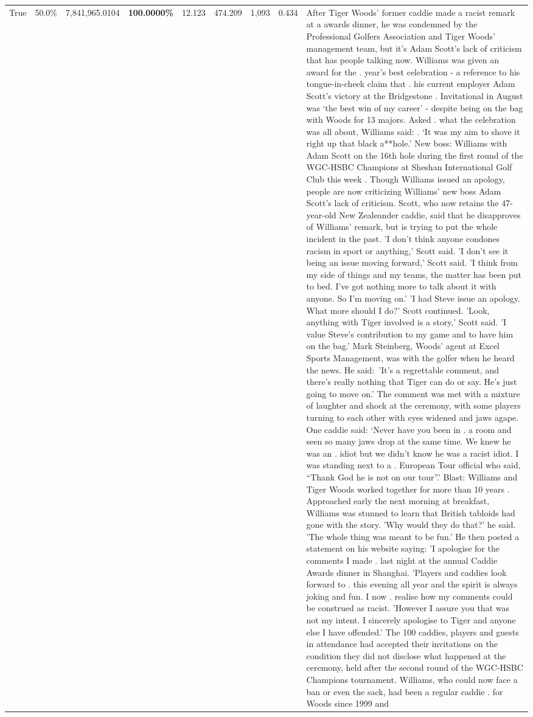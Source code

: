 \begin{table}[H]
\begin{tabular}{lllrlllll}
True & 50.0\% & 7,841,965.0104 & \bfseries \color{red} 100.0000\% & 12.123 & 474.209 & 1,093 & 0.434 & After Tiger Woods' former caddie made a racist remark at a awards dinner, he was condemned by the Professional Golfers Association and Tiger Woods' management team, but it's Adam Scott's lack of criticism that has people talking now. Williams was given an award for the . year’s best celebration - a reference to his tongue-in-cheek claim that . his current employer Adam Scott’s victory at the Bridgestone . Invitational in August was ‘the best win of my career’ - despite being on the bag with Woods for 13 majors. Asked . what the celebration was all about, Williams said: . ‘It was my aim to shove it right up that black a**hole.’ New boss: Williams with Adam Scott  on the 16th hole during the first round of the WGC-HSBC Champions at Sheshan International Golf Club this week . Though Williams issued an apology, people are now criticizing Williams' new boss Adam Scott's lack of criticism. Scott, who now retains the 47-year-old New Zealeander caddie, said that he disapproves of Williams' remark, but is trying to put the whole incident in the past. 'I don't think anyone condones racism in sport or anything,' Scott said. 'I don't see it being an issue moving forward,' Scott said. 'I think from my side of things and my teams, the matter has been put to bed. I've got nothing more to talk about it with anyone. So I'm moving on.' 'I had Steve issue an apology. What more should I do?' Scott continued. 'Look, anything with Tiger involved is a story,' Scott said. 'I value Steve's contribution to my game and to have him on the bag.' Mark Steinberg, Woods' agent at Excel Sports Management, was with the golfer when he heard the news. He said: 'It's a regrettable comment, and there's really nothing that Tiger can do or say. He's just going to move on.' The comment was met with a mixture of laughter and shock at the ceremony, with some players turning to each other with eyes widened and jaws agape. One caddie said: ‘Never have you been in . a room and seen so many jaws drop at the same time. We knew he was an . idiot but we didn’t know he was a racist idiot. I was standing next to a . European Tour official who said, “Thank God he is not on our tour”.’ Blast: Williams and Tiger Woods worked together for more than 10 years . Approached early the next morning at breakfast, Williams was stunned to learn that British tabloids had gone with the story. 'Why would they do that?' he said. 'The whole thing was meant to be fun.' He then posted a statement on his website saying: 'I apologise for the comments I made . last night at the annual Caddie Awards dinner in Shanghai. 'Players and caddies look forward to . this evening all year and the spirit is always joking and fun. I now . realise how my comments could be construed as racist. 'However I assure you that was not my intent. I sincerely apologise to Tiger and anyone else I have offended.' The 100 caddies, players and guests in attendance had accepted their invitations on the condition they did not disclose what happened at the ceremony, held after the second round of the WGC-HSBC Champions tournament. Williams, who could now face a ban or even the sack, had been a regular caddie . for Woods since 1999 and 
\end{tabular}
\end{table}
